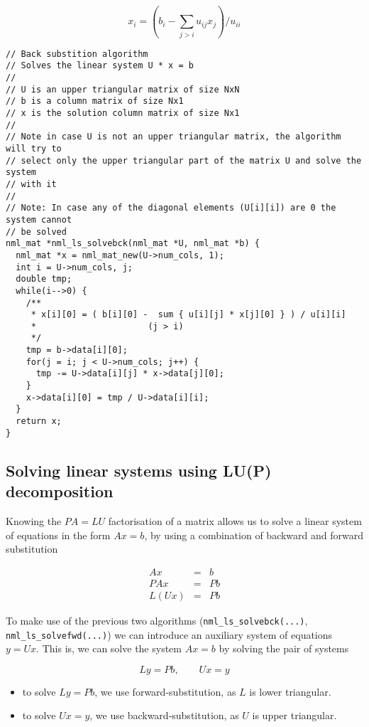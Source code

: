 $$
x_i = \left( b_i - \sum_{j>i} u_{ij}x_j \right) / u_{ii}
$$

\begin{verbatim}
// Back substition algorithm
// Solves the linear system U * x = b
//
// U is an upper triangular matrix of size NxN
// b is a column matrix of size Nx1
// x is the solution column matrix of size Nx1
//
// Note in case U is not an upper triangular matrix, the algorithm will try to
// select only the upper triangular part of the matrix U and solve the system
// with it
//
// Note: In case any of the diagonal elements (U[i][i]) are 0 the system cannot
// be solved
nml_mat *nml_ls_solvebck(nml_mat *U, nml_mat *b) {
  nml_mat *x = nml_mat_new(U->num_cols, 1);
  int i = U->num_cols, j;
  double tmp;
  while(i-->0) {
    /**
     * x[i][0] = ( b[i][0] -  sum { u[i][j] * x[j][0] } ) / u[i][i]
     *                      (j > i)
     */
    tmp = b->data[i][0];
    for(j = i; j < U->num_cols; j++) {
      tmp -= U->data[i][j] * x->data[j][0];
    }
    x->data[i][0] = tmp / U->data[i][i];
  }
  return x;
}
\end{verbatim}

\subsection{Solving linear systems using LU(P) decomposition}

Knowing the $PA=LU$ factorisation of a matrix allows us to solve a linear system of equations in the form $Ax=b$, by using a combination of backward and forward substitution

\begin{eqnarray}
\nonumber Ax & = & b \\
\nonumber PAx & = & Pb \\
\nonumber L(Ux) & = & Pb
\end{eqnarray}

To make use of the previous two algorithms ({\tt nml\_ls\_solvebck(...)}, {\tt nml\_ls\_solvefwd(...)}) we can introduce an auxiliary system of equations $y=Ux$. This is, we can solve the system $Ax=b$ by solving the pair of systems

$$
Ly = Pb, \qquad Ux = y
$$

\begin{itemize}
\item to solve $Ly = Pb$, we use forward-substitution, as $L$ is lower triangular.
\item to solve $Ux = y$, we use backward-substitution, as $U$ is upper triangular.
\end{itemize}


